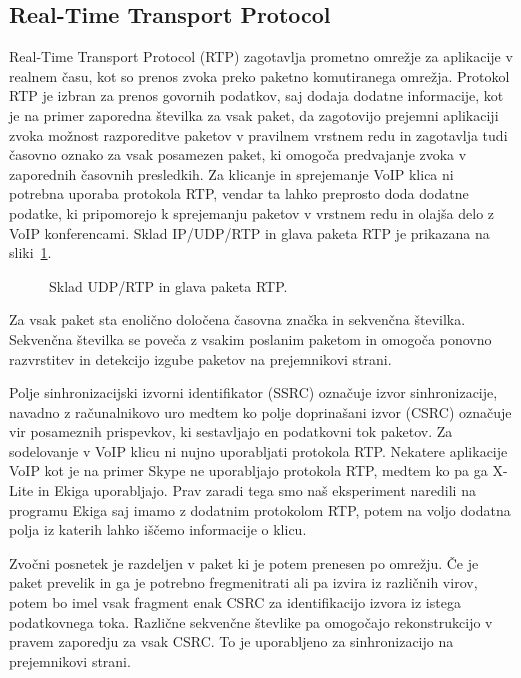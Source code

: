 \documentclass{acm_proc_article-sp}
\begin{document}
\subsection{Real-Time Transport Protocol}

Real-Time Transport Protocol (RTP) zagotavlja prometno omrežje za aplikacije v realnem času, kot so prenos zvoka preko paketno komutiranega omrežja. Protokol RTP je izbran za prenos govornih podatkov, saj dodaja dodatne informacije, kot je na primer zaporedna številka za vsak paket, da zagotovijo prejemni aplikaciji zvoka možnost razporeditve paketov v pravilnem vrstnem redu in zagotavlja tudi časovno oznako za vsak posamezen paket, ki omogoča predvajanje zvoka v zaporednih časovnih presledkih. Za klicanje in sprejemanje VoIP klica ni potrebna uporaba protokola RTP, vendar ta lahko preprosto doda dodatne podatke, ki pripomorejo k sprejemanju paketov v vrstnem redu in olajša delo z VoIP konferencami. Sklad IP/UDP/RTP in glava paketa RTP je prikazana na sliki~\ref{fig:ip-udp-rtp}.

\begin{figure}
\centering
{} %
\caption{Sklad UDP/RTP in glava paketa RTP.}
\label{fig:ip-udp-rtp}
\end{figure}

Za vsak paket sta enolično določena časovna značka in sekv\-enčna številka. Sekvenčna številka se poveča z vsakim poslanim paketom in omogoča ponovno razvrstitev in detekcijo izgube paketov na prejemnikovi strani.

Polje sinhronizacijski izvorni identifikator (SSRC) označuje izvor sinhronizacije, navadno z računalnikovo uro medtem ko polje doprinašani izvor (CSRC) označuje vir posameznih prispevkov, ki sestavljajo en podatkovni tok paketov. Za sodelovanje v VoIP klicu ni nujno uporabljati protokola RTP. Nekatere aplikacije VoIP kot je na primer Skype ne uporabljajo protokola RTP, medtem ko pa ga X-Lite in Ekiga\cite{EKIGA} uporabljajo. Prav zaradi tega smo naš eksperiment naredili na programu Ekiga saj imamo z dodatnim protokolom RTP, potem na voljo dodatna polja iz katerih lahko iščemo informacije o klicu.

Zvočni posnetek je razdeljen v paket ki je potem prenesen po omrežju. Če je paket prevelik in ga je potrebno fregmenitrati ali pa izvira iz različnih virov, potem bo imel vsak fragment enak CSRC za identifikacijo izvora iz istega podatkovnega toka. Različne sekvenčne števlike pa omogočajo rekonstrukcijo v pravem zaporedju za vsak CSRC. To je uporabljeno za sinhronizacijo na prejemnikovi strani.
\end{document}
